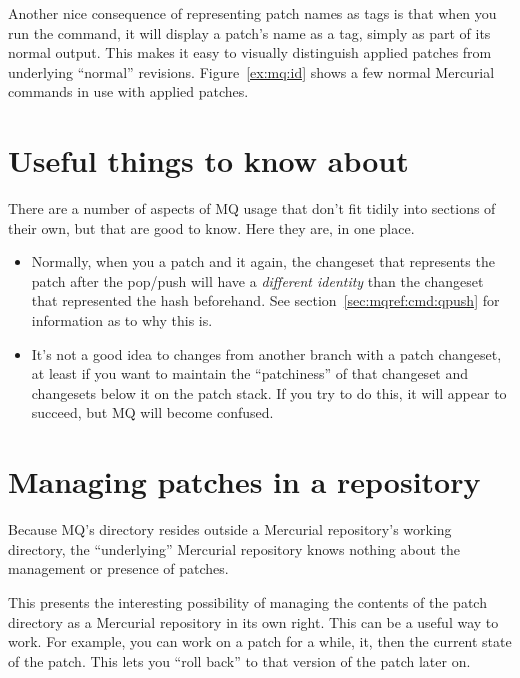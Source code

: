 Another nice consequence of representing patch names as tags is that
when you run the  command, it will display a patch's name
as a tag, simply as part of its normal output.  This makes it easy to
visually distinguish applied patches from underlying ``normal''
revisions.  Figure~\ref{ex:mq:id} shows a few normal Mercurial
commands in use with applied patches.

\section{Useful things to know about}

There are a number of aspects of MQ usage that don't fit tidily into
sections of their own, but that are good to know.  Here they are, in
one place.

\begin{itemize}
\item Normally, when you  a patch and  it
  again, the changeset that represents the patch after the pop/push
  will have a \emph{different identity} than the changeset that
  represented the hash beforehand.  See
  section~\ref{sec:mqref:cmd:qpush} for information as to why this is.
\item It's not a good idea to  changes from another
  branch with a patch changeset, at least if you want to maintain the
  ``patchiness'' of that changeset and changesets below it on the
  patch stack.  If you try to do this, it will appear to succeed, but
  MQ will become confused.
\end{itemize}

\section{Managing patches in a repository}
\label{sec:mq:repo}

Because MQ's  directory resides outside a
Mercurial repository's working directory, the ``underlying'' Mercurial
repository knows nothing about the management or presence of patches.

This presents the interesting possibility of managing the contents of
the patch directory as a Mercurial repository in its own right.  This
can be a useful way to work.  For example, you can work on a patch for
a while,  it, then  the current state of
the patch.  This lets you ``roll back'' to that version of the patch
later on.

